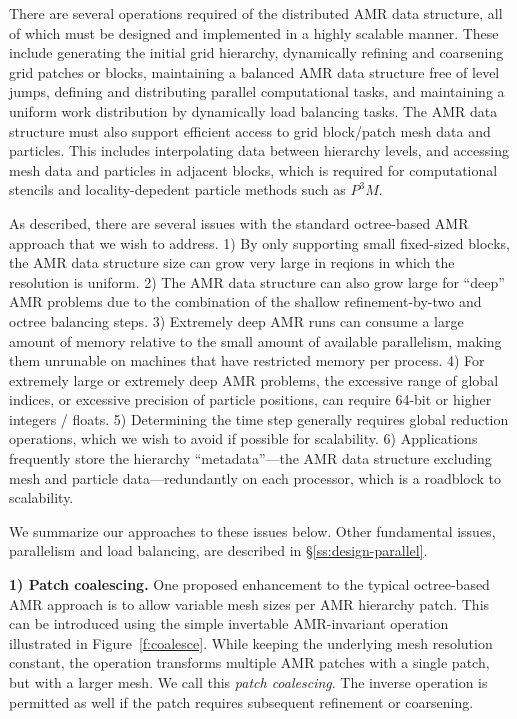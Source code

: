 \documentclass[10pt,twocolumn]{article}
\begin{document}
There are several operations required of the distributed AMR data
structure, all of which must be designed and implemented in a highly
scalable manner.  These include generating the initial grid hierarchy,
dynamically refining and coarsening grid patches or blocks,
maintaining a balanced AMR data structure free of level jumps,
defining and distributing parallel computational tasks, and
maintaining a uniform work distribution by dynamically load balancing
tasks.  The AMR data structure must also support efficient access to
grid block/patch mesh data and particles.  This includes interpolating
data between hierarchy levels, and accessing mesh data and particles
in adjacent blocks, which is required for computational stencils and
locality-depedent particle methods such as $P^3M$.

As described, there are several issues with the standard octree-based
AMR approach that we wish to address.  
%
1) By only supporting small fixed-sized blocks, the AMR data structure
size can grow very large in reqions in which the resolution is
uniform.
%
2) The AMR data structure can also grow large for ``deep'' AMR
problems due to the combination of the shallow refinement-by-two and
octree balancing steps.
%
3) Extremely deep AMR runs can consume a large amount of memory
relative to the small amount of available parallelism, making them
unrunable on machines that have restricted memory per process.
%
4) For extremely large or extremely deep AMR problems, the excessive
range of global indices, or excessive precision of particle positions,
can require 64-bit or higher integers / floats.
%
5) Determining the time step generally requires global reduction
operations, which we wish to avoid if possible for scalability.
%
6) Applications frequently store the hierarchy ``metadata''---the AMR
data structure excluding mesh and particle data---redundantly on each
processor, which is a roadblock to scalability.

We summarize our approaches to these issues below.  Other 
fundamental issues, parallelism and  load balancing, are described in
\S\ref{ss:design-parallel}.


\textbf{1) Patch coalescing.} One proposed enhancement to the typical
octree-based AMR approach is to allow variable mesh sizes per AMR
hierarchy patch.  This can be introduced using the simple invertable
AMR-invariant operation illustrated in Figure~\ref{f:coalesce}.  While
keeping the underlying mesh resolution constant, the operation
transforms multiple AMR patches with a single patch, but with a larger
mesh.  We call this \textit{patch coalescing}.  The inverse operation
is permitted as well if the patch requires subsequent refinement or
coarsening.
\end{document}
